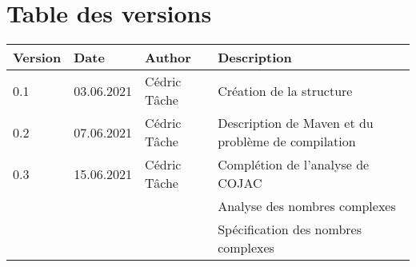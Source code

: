 \documentclass[french,11pt]{report}
\begin{document}



\section *{Table des versions}
\vspace*{0.5 cm}

\begin{table}[h]
    \begin{tabularx}{\columnwidth}{ | p{3.5em} |p{7em} | p{6.5em} | X |}
        \hline
        \textbf{Version} & \textbf{Date} & \textbf{Author} & \textbf{Description} \\
        \hline
        0.1 & 03.06.2021 & Cédric Tâche & Création de la structure \\
        0.2 & 07.06.2021 & Cédric Tâche & Description de Maven et du problème de compilation \\
        0.3 & 15.06.2021 & Cédric Tâche & Complétion de l'analyse de COJAC \\
         & & & Analyse des nombres complexes \\
         & & & Spécification des nombres complexes \\
        \hline
    \end{tabularx}
\end{table}

\newpage


\hypersetup{
	hidelinks,
	allcolors=black,
	linktocpage,
	linktoc=all
}
\tableofcontents
\newpage




\end{document}
